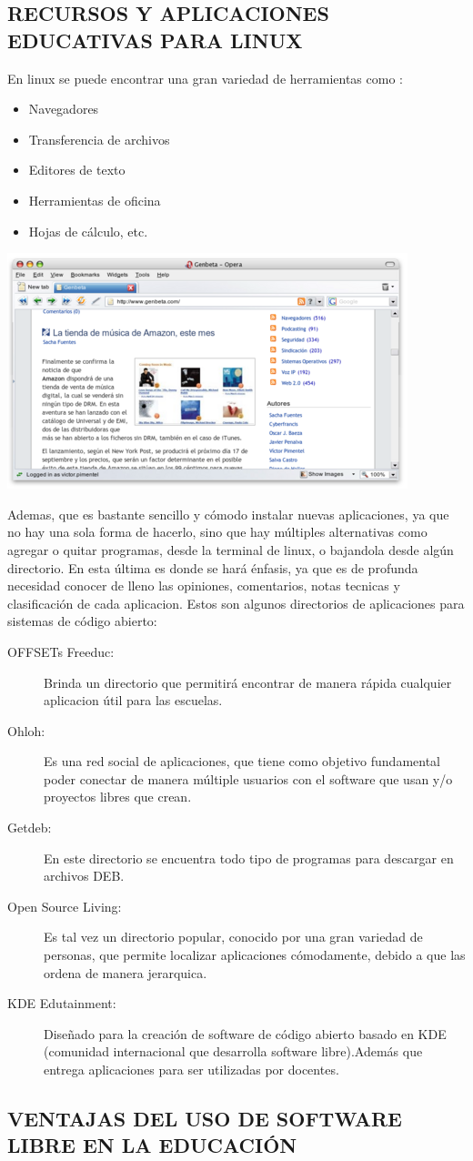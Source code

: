 \subsection*{RECURSOS Y APLICACIONES EDUCATIVAS PARA LINUX}
En linux se puede encontrar una gran variedad de herramientas
como :
\begin{itemize}
  \item Navegadores
  \item Transferencia de archivos
  \item Editores de texto
  \item Herramientas de oficina
  \item Hojas de cálculo, etc.
\end{itemize}
\includegraphics[scale=0.5]{img/cp06/img0602.png}

Ademas, que es bastante sencillo y cómodo instalar nuevas
aplicaciones, ya que no hay una sola forma de hacerlo, sino que
hay múltiples alternativas como agregar o quitar programas,
desde la terminal de linux, o bajandola desde algún directorio.
En esta última es donde se hará énfasis, ya que es de profunda
necesidad conocer de lleno las opiniones, comentarios, notas
tecnicas y clasificación de cada aplicacion. Estos son algunos
directorios de aplicaciones para sistemas de código abierto:
\begin{description}
	\item[ OFFSETs Freeduc:] Brinda un directorio que permitirá encontrar
	de manera rápida cualquier aplicacion útil para las escuelas.
	\item[ Ohloh:] Es una red social de aplicaciones, que tiene como
	objetivo fundamental poder conectar de manera múltiple
	usuarios con el software que usan y/o proyectos libres que
	crean.
	\item[ Getdeb:] En este directorio se encuentra todo tipo de programas
	para descargar en archivos DEB.
	\item[ Open Source Living:]Es tal vez un directorio popular, conocido
	por una gran variedad de personas, que permite localizar
	aplicaciones cómodamente, debido a que las ordena de manera
	jerarquica.
	\item[ KDE Edutainment:] Diseñado para la creación de software de
	código abierto basado en KDE (comunidad internacional que
	desarrolla software libre).Además que entrega aplicaciones para
	ser utilizadas por docentes.
\end{description}

\subsection*{VENTAJAS DEL USO DE SOFTWARE LIBRE EN LA EDUCACIÓN}

